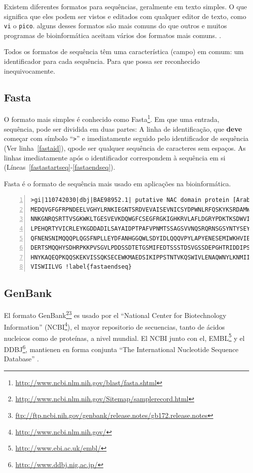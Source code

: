 \documentclass[letter,11pt]{book}
\begin{document}
Existem diferentes formatos para sequências, geralmente em texto simples. O que significa que eles podem ser vistos e editados com qualquer editor de texto, como \Verb+vi+ o \Verb+pico+. alguns desses formatos são mais comuns do que outros e muitos programas de bioinformática aceitam vários dos formatos mais comuns. \citep{Leonard2007}.

Todos os formatos de sequência têm uma característica (campo) em comum: um identificador para cada sequência. Para que possa ser reconhecido inequivocamente.

\subsection{Fasta}

O formato mais simples é conhecido como Fasta\footnote{\url{http://www.ncbi.nlm.nih.gov/blast/fasta.shtml}}. Em que uma entrada, sequência, pode ser dividida em duas partes: A linha de identificação, que \textbf{deve} começar com símbolo ``\Verb+>+'' e imediatamente seguido pelo identificador de sequência (Ver linha~\ref{fastaid}), qpode ser qualquer sequência de caracteres sem espaços. As linhas imediatamente após o identificador correspondem à sequência em si (Líneas~\ref{fastastartseq}-\ref{fastaendseq}).

Fasta é o formato de sequência mais usado em aplicações na bioinformática.
 
\begin{Verbatim}[commandchars=!\{\},numbers=left,firstnumber=last,label=Secuencia en formato FastA,frame=topline,fontsize=\scriptsize]
>gi|110742030|dbj|BAE98952.1| putative NAC domain protein [Arabidopsis thaliana] !label{fastaid}
MEDQVGFGFRPNDEELVGHYLRNKIEGNTSRDVEVAISEVNICSYDPWNLRFQSKYKSRDAMWYFFSRRE !label{fastastartseq}
NNKGNRQSRTTVSGKWKLTGESVEVKDQWGFCSEGFRGKIGHKRVLAFLDGRYPDKTKSDWVIHEFHYDL
LPEHQRTYVICRLEYKGDDADILSAYAIDPTPAFVPNMTSSAGSVVNQSRQRNSGSYNTYSEYDSANHGQ
QFNENSNIMQQQPLQGSFNPLLEYDFANHGGQWLSDYIDLQQQVPYLAPYENESEMIWKHVIEENFEFLV
DERTSMQQHYSDHRPKKPVSGVLPDDSSDTETGSMIFEDTSSSTDSVGSSDEPGHTRIDDIPSLNIIEPL
HNYKAQEQPKQQSKEKVISSQKSECEWKMAEDSIKIPPSTNTVKQSWIVLENAQWNYLKNMIIGVLLFIS
VISWIILVG !label{fastaendseq}
\end{Verbatim} 

\subsection{GenBank}

El formato GenBank\footnote{\url{http://www.ncbi.nlm.nih.gov/Sitemap/samplerecord.html}}\footnote{\url{ftp://ftp.ncbi.nih.gov/genbank/release.notes/gb172.release.notes}} es usado por el ``National Center for Biotechnology Information'' (NCBI\footnote{\url{http://www.ncbi.nlm.nih.gov/}}), el mayor repositorio de secuencias, tanto de ácidos nucleicos como de proteínas, a nivel mundial. El NCBI junto con el, EMBL\footnote{\url{http://www.ebi.ac.uk/embl/}} y el DDBJ\footnote{\url{http://www.ddbj.nig.ac.jp/}},  mantienen en forma conjunta ``The International Nucleotide Sequence Database'' \citep{Mizrachi2008}.
\end{document}
